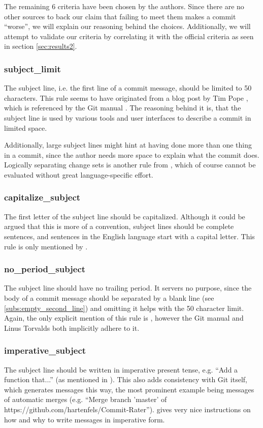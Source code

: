 The remaining 6 criteria have been chosen by the authors. Since there are no other sources to back our claim that failing to meet them makes a commit ``worse'', we will explain our reasoning behind the choices. Additionally, we will attempt to validate our criteria by correlating it with the official criteria as seen in section \ref{sec:results2}.

\subsubsection{subject\_limit}
\label{subs:subject_limit}
The subject line, i.e. the first line of a commit message, should be limited to 50 characters. This rule seems to have originated from a blog post by Tim Pope \cite{TP}, which is referenced by the Git manual \cite{OffGuide}. The reasoning behind it is, that the subject line is used by various tools and user interfaces to describe a commit in limited space.

Additionally, large subject lines might hint at having done more than one thing in a commit, since the author needs more space to explain what the commit does. Logically separating change sets is another rule from \cite{OffGuide}, which of course cannot be evaluated without great language-specific effort.

\subsubsection{capitalize\_subject}
\label{subs:capitalize_subject}
The first letter of the subject line should be capitalized. Although it could be argued that this is more of a convention, subject lines should be complete sentences, and sentences in the English language start with a capital letter. This rule is only mentioned by \cite{CB}.

\subsubsection{no\_period\_subject}
\label{subs:no_period_subject}
The subject line should have no trailing period. It servers no purpose, since the body of a commit message should be separated by a blank line (see \ref{subs:empty_second_line}) and omitting it helps with the 50 character limit. Again, the only explicit mention of this rule is \cite{CB}, however the Git manual \cite{OffGuide} and Linus Torvalds \cite{SR} both implicitly adhere to it.

\subsubsection{imperative\_subject}
\label{subs:imperative_subject}
The subject line should be written in imperative present tense, e.g. ``Add a function that...'' (as mentioned in \cite{OffGuide}). This also adds consistency with Git itself, which generates messages this way, the most prominent example being messages of automatic merges (e.g. ``Merge branch 'master' of https://github.com/hartenfels/Commit-Rater''). \cite{CB} gives very nice instructions on how and why to write messages in imperative form.

